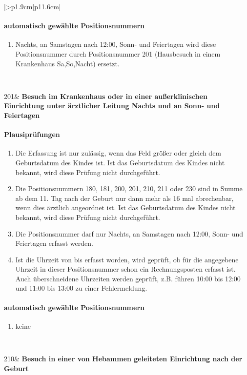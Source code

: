 \begin{mpsupertabular}{|>{\centering}p{1.9cm}|p{11.6cm}|}
\paragraph{automatisch gewählte Positionsnummern}
\begin{enumerate}
\item
Nachts, an Samstagen nach 12:00, Sonn- und Feiertagen wird 
diese Positionsnummer durch Positionsnummer
201 (Hausbesuch in einem Krankenhaus Sa,So,Nacht) ersetzt.
\end{enumerate}
\\ \hline


201&
\textbf{Besuch im Krankenhaus oder in einer außerklinischen Einrichtung
unter ärztlicher Leitung Nachts und an Sonn- und Feiertagen}
\paragraph{Plausiprüfungen}
\begin{enumerate}
\item
Die Erfassung ist nur zulässig, wenn das Feld  größer 
oder gleich dem Geburtsdatum des Kindes ist. Ist das Geburtsdatum des
Kindes nicht bekannt, wird diese Prüfung nicht durchgeführt.
\item
Die Positionsnummern 180, 181, 200, 201, 210, 211 oder 230 sind in Summe 
ab dem 11. Tag nach der Geburt nur dann mehr 
als 16 mal abrechenbar, wenn dies ärztlich angeordnet ist.
Ist das Geburtsdatum des
Kindes nicht bekannt, wird diese Prüfung nicht durchgeführt.
\item
Die Positionsnummer darf nur Nachts, an Samstagen nach 12:00, 
Sonn- und Feiertagen erfasst werden.
\item
Ist die Uhrzeit von bis erfasst worden, wird geprüft, ob für die angegebene 
Uhrzeit in dieser Positionsnummer
schon ein Rechnungsposten erfasst ist. Auch überschneidene Uhrzeiten
werden geprüft, z.B. führen 10:00 bis 12:00 und 11:00 bis 13:00 zu einer
Fehlermeldung.
\end{enumerate}
\paragraph{automatisch gewählte Positionsnummern}
\begin{enumerate}
\item
keine
\end{enumerate}
\\ \hline


210&
\textbf{Besuch in einer von Hebammen geleiteten Einrichtung
nach der Geburt}

\end{mpsupertabular}
